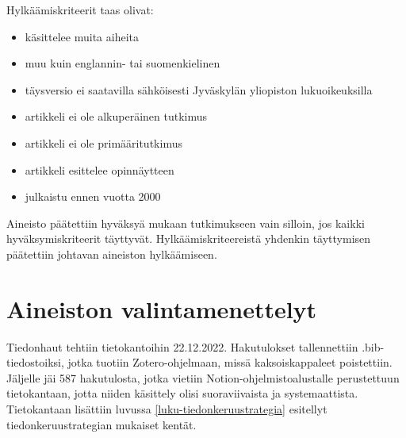 \documentclass[utf8]{gradu3}
\begin{document}
Hylkäämiskriteerit taas olivat:

\begin{itemize}
    \item käsittelee muita aiheita
    \item muu kuin englannin- tai suomenkielinen
    \item täysversio ei saatavilla sähköisesti Jyväskylän yliopiston lukuoikeuksilla
    \item artikkeli ei ole alkuperäinen tutkimus
    \item artikkeli ei ole primääritutkimus
    \item artikkeli esittelee opinnäytteen
    \item julkaistu ennen vuotta 2000
\end{itemize}

Aineisto päätettiin hyväksyä mukaan tutkimukseen vain silloin, jos kaikki hyväksymiskriteerit täyttyvät. Hylkäämiskriteereistä yhdenkin täyttymisen päätettiin johtavan aineiston hylkäämiseen.




\section{Aineiston valintamenettelyt}

Tiedonhaut tehtiin tietokantoihin 22.12.2022. Hakutulokset tallennettiin .bib-tiedostoiksi, jotka tuotiin Zotero-ohjelmaan, missä kaksoiskappaleet poistettiin. Jäljelle jäi 587 hakutulosta, jotka vietiin Notion-ohjelmistoalustalle perustettuun tietokantaan, jotta niiden käsittely olisi suoraviivaista ja systemaattista. Tietokantaan lisättiin luvussa \ref{luku-tiedonkeruustrategia} esitellyt tiedonkeruustrategian mukaiset kentät.
\end{document}
